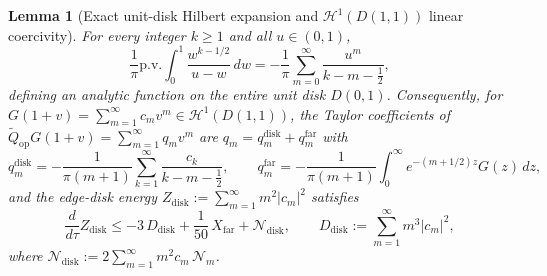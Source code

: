 \documentclass[11pt,a4paper]{article}
\newtheorem{lem}{Lemma}[section]
\begin{document}
\begin{lem}[Exact unit-disk Hilbert expansion and $\mathcal{H}^1(D(1,1))$ linear coercivity]\label{lem:disk_coercive}
For every integer $k\ge 1$ and all $u\in(0,1)$,
\begin{equation}\label{eq:exact_disk_hilb}
\frac{1}{\pi}\mathrm{p.v.}\int_0^1 \frac{w^{k-1/2}}{u-w}\,dw = -\frac{1}{\pi}\sum_{m=0}^\infty \frac{u^m}{k-m-\tfrac12},
\end{equation}
defining an analytic function on the entire unit disk $D(0,1)$.
Consequently, for $G(1+v)=\sum_{m=1}^\infty c_m v^m\in\mathcal{H}^1(D(1,1))$, the Taylor coefficients of
$\widetilde{Q}_{\mathrm{op}}G(1+v)=\sum_{m=1}^\infty q_m v^m$ are $q_m = q_m^{\mathrm{disk}} + q_m^{\mathrm{far}}$ with
\begin{equation}\label{eq:qm_exact}
q_m^{\mathrm{disk}} = -\frac{1}{\pi(m+1)}\sum_{k=1}^\infty \frac{c_k}{k-m-\tfrac12}, \qquad
q_m^{\mathrm{far}} = -\frac{1}{\pi(m+1)}\int_0^\infty e^{-(m+1/2)z}G(z)\,dz,
\end{equation}
and the edge-disk energy $Z_{\mathrm{disk}}:=\sum_{m=1}^\infty m^2|c_m|^2$ satisfies
\begin{equation}\label{eq:Zdisk_dot}
\frac{d}{d\tau}Z_{\mathrm{disk}} \le -3\,D_{\mathrm{disk}} + \frac{1}{50}\,X_{\mathrm{far}} + \mathcal{N}_{\mathrm{disk}},
\qquad D_{\mathrm{disk}} := \sum_{m=1}^\infty m^3|c_m|^2,
\end{equation}
where $\mathcal{N}_{\mathrm{disk}} := 2\sum_{m=1}^\infty m^2 c_m\,\mathcal{N}_m$.
\end{lem}
\end{document}

